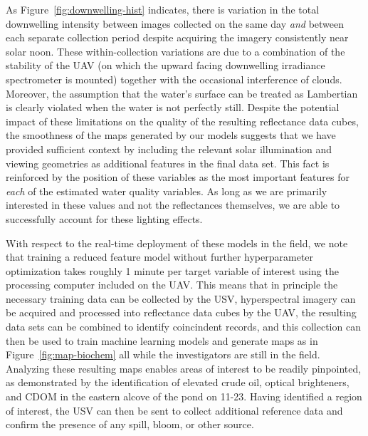 \documentclass[remotesensing,article,submit,pdftex,moreauthors]{Definitions/mdpi}
\begin{document}
As Figure~\ref{fig:downwelling-hist} indicates, there is variation in the total downwelling intensity between images collected on the same day \textit{and} between each separate collection period despite acquiring the imagery consistently near solar noon. These within-collection variations are due to a combination of the stability of the UAV (on which the upward facing downwelling irradiance spectrometer is mounted) together with the occasional interference of clouds. Moreover, the assumption that the water's surface can be treated as Lambertian is clearly violated when the water is not perfectly still. Despite the potential impact of these limitations on the quality of the resulting reflectance data cubes, the smoothness of the maps generated by our models suggests that we have provided sufficient context by including the relevant solar illumination and viewing geometries as additional features in the final data set.  This fact is reinforced by the position of these variables as the most important features for \textit{each} of the estimated water quality variables. As long as we are primarily interested in these values and not the reflectances themselves, we are able to successfully account for these lighting effects.

With respect to the real-time deployment of these models in the field, we note that training a reduced feature model without further hyperparameter optimization takes roughly 1 minute per target variable of interest using the processing computer included on the UAV. This means that in principle the necessary training data can be collected by the USV, hyperspectral imagery can be acquired and processed into reflectance data cubes by the UAV, the resulting data sets can be combined to identify coincindent records, and this collection can then be used to train machine learning models and generate maps as in Figure~\ref{fig:map-biochem} all while the investigators are still in the field. Analyzing these resulting maps enables areas of interest to be readily pinpointed, as demonstrated by the identification of elevated crude oil, optical brighteners, and CDOM in the eastern alcove of the pond on 11-23. Having identified a region of interest, the USV can then be sent to collect additional reference data and confirm the presence of any spill, bloom, or other source.
\end{document}
